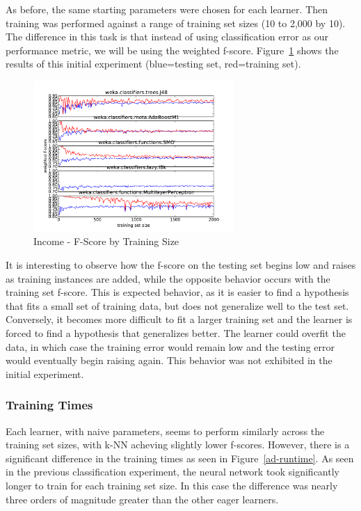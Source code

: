 \documentclass{sig-alternate}
\begin{document}
As before, the same starting parameters were chosen for each learner. Then training was performed against a range of training set sizes (10 to 2,000 by 10). The difference in this task is that instead of using classification error as our performance metric, we will be using the weighted f-score. Figure~\ref{ad-error} shows the results of this initial experiment (blue=testing set, red=training set).

\begin{figure}[!htbp]
    \centering
    \includegraphics[width=3in]{data/adult/learning-curve-10to2000/stacked-fscore.pdf}
    \caption{Income - F-Score by Training Size \label{ad-error}}
\end{figure} 

It is interesting to observe how the f-score on the testing set begins low and raises as training instances are added, while the opposite behavior occurs with the training set f-score. This is expected behavior, as it is easier to find a hypothesis that fits a small set of training data, but does not generalize well to the test set. Conversely, it becomes more difficult to fit a larger training set and the learner is forced to find a hypothesis that generalizes better. The learner could overfit the data, in which case the training error would remain low and the testing error would eventually begin raising again. This behavior was not exhibited in the initial experiment. 


\subsubsection{Training Times}

Each learner, with naive parameters, seems to perform similarly across the training set sizes, with k-NN acheving slightly lower f-scores. However, there is a significant difference in the training times as seen in Figure~\ref{ad-runtime}. As seen in the previous classification experiment, the neural network took significantly longer to train for each training set size. In this case the difference was nearly three orders of magnitude greater than the other eager learners.
\end{document}

